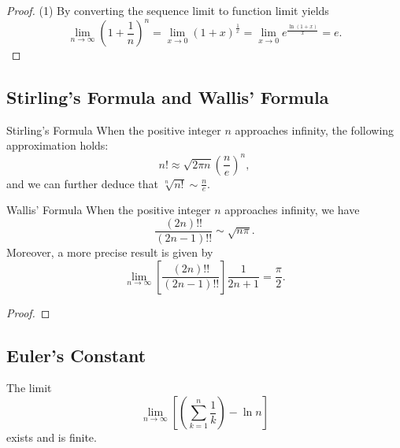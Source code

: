 \begin{proof}
  (1) By converting the sequence limit to function limit yields
  \begin{equation}
    \lim \limits _{n \rightarrow \infty} \left( 1 + \frac{1}{n} \right)^n
    = \lim \limits _{x \rightarrow 0} (1 + x)^{\frac{1}{x}}
    = \lim \limits _{x \rightarrow 0} e^{\frac{\ln (1 + x)}{x}} = e.
  \end{equation}
\end{proof}

\subsection{Stirling's Formula and Wallis' Formula}

\begin{theorem}{Stirling's Formula}{}
  When the positive integer $n$ approaches infinity,
  the following approximation holds:
  \begin{equation}
    n! \approx \sqrt{2\pi n} \left( \frac{n}{e} \right)^n,
  \end{equation}
  and we can further deduce that $\sqrt[n]{n!} \sim \frac{n}{e}$.
\end{theorem}

\begin{theorem}{Wallis' Formula}{}
  When the positive integer $n$ approaches infinity,
  we have
  \begin{equation}
    \frac{(2n)!!}{(2n - 1)!!} \sim \sqrt{n \pi}.
  \end{equation}
  Moreover, a more precise result is given by
  \begin{equation}
    \lim \limits _{n \rightarrow \infty} \left[
      \frac{(2n)!!}{(2n - 1)!!}
    \right]\frac{1}{2n+1} = \frac{\pi}{2}.
  \end{equation}
\end{theorem}

\begin{proof}
  
\end{proof}

\subsection{Euler's Constant}

\begin{lemma}{}{}
  The limit
  \begin{equation}
    \lim \limits _{n \rightarrow \infty}
  \left[ (\sum\limits_{k = 1}^n \frac{1}{k}) - \ln n \right]
  \end{equation}
  exists and is finite.
\end{lemma}

